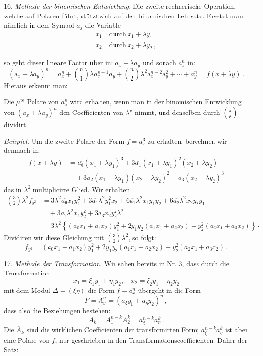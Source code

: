 \documentclass[11pt]{article}
\providecommand{\weberpage}[1]{}
\providecommand{\weq}[2]{\begin{equation}\tag{#1}#2\end{equation}}
\let\Delta\varDelta
\begin{document}
16. \textit{Methode der binomischen Entwicklung.} Die zweite rechnerische Operation, welche auf Polaren führt, stützt sich auf den binomischen Lehrsatz. Ersetzt man nämlich in dem Symbol $a_x$ die Variable
\[
\begin{aligned}
x_1 &\ \text{durch}\ x_1+\lambda y_1\\
x_2 &\ \text{durch}\ x_2+\lambda y_2\,,
\end{aligned}
\]


\weberpage{20}

so geht dieser lineare Factor über in: $a_x+\lambda a_y$ und sonach $a_x^n$ in:
\[ (a_x+\lambda a_y)^n = a_x^n+\binom{n}{1}\lambda a_x^{n-1}a_y+\binom{n}{2}\lambda^2a_x^{n-2}a_y^2+\cdots+a_y^n = f(x+\lambda y)\,. \]
Hieraus erkennt man:

\glqq Die $\mu^{\text{te}}$ Polare von $a_x^n$ wird erhalten, wenn man in der binomischen Entwicklung von $(a_x+\lambda a_y)^n$ den Coefficienten von $\lambda^\mu$ nimmt, und denselben durch $\binom{n}{\mu}$ dividirt.\grqq{}

\textit{Beispiel.} Um die zweite Polare der Form $f=a_x^3$ zu erhalten, berechnen wir demnach in:
\[
\begin{aligned}
f(x+\lambda y) &= \overline{a_0}(x_1+\lambda y_1)^3+3\overline{a_1}(x_1+\lambda y_1)^2(x_2+\lambda y_2)\\
&\quad+3\overline{a_2}(x_1+\lambda y_1)(x_2+\lambda y_2)^2+\overline{a_3}(x_2+\lambda y_2)^3
\end{aligned}
\]
das in $\lambda^2$ multiplicirte Glied. Wir erhalten
\[
\begin{aligned}
\binom{3}{2}\lambda^2f_{y^2} &= 3\lambda^2\overline{a_0}x_1y_1^2+3\overline{a_1}\lambda^2y_1^2x_2+6\overline{a_1}\lambda^2x_1y_1y_2+6\overline{a_2}\lambda^2x_2y_2y_1\\
&\quad+3\overline{a_2}\lambda^2x_1y_2^2+3\overline{a_3}x_2y_2^2\lambda^2\\
&= 3\lambda^2\left\{(\overline{a_0}x_1+\overline{a_1}x_2)y_1^2+2y_1y_2(\overline{a_1}x_1+\overline{a_2}x_2)+y_2^2(\overline{a_2}x_1+\overline{a_3}x_2)\right\}\cdot
\end{aligned}
\]
Dividiren wir diese Gleichung mit $\binom{3}{2}\lambda^2$, so folgt:
\[ f_{y^2} = (\overline{a_0}x_1+\overline{a_1}x_2)y_1^2+2y_1y_2(\overline{a_1}x_1+\overline{a_2}x_2)+y_2^2(\overline{a_2}x_1+\overline{a_3}x_2)\,. \]

17. \textit{Methode der Transformation.} Wir sahen bereits in Nr. 3, dass durch die Transformation
\weq{I}{x_1 = \xi_1y_1+\eta_1y_2,\quad x_2 = \xi_2y_1+\eta_2y_2}
mit dem Modul $\Delta=(\xi\eta)$ die Form $f=a_x^n$ übergeht in die Form
\[ F = A_y^n = (a_\xi y_1+a_\eta y_2)^n\,, \]
dass also die Beziehungen bestehen:
\[ \overline{A}_k = A_1^{n-k}A_2^k = a_\xi^{n-k}a_\eta^k\,. \]
Die $\overline{A}_k$ sind die wirklichen Coefficienten der transformirten Form; $a_\xi^{n-k}a_\eta^k$ ist aber eine Polare von $f$, nur geschrieben in den Transformationscoefficienten. Daher der Satz:
\end{document}
